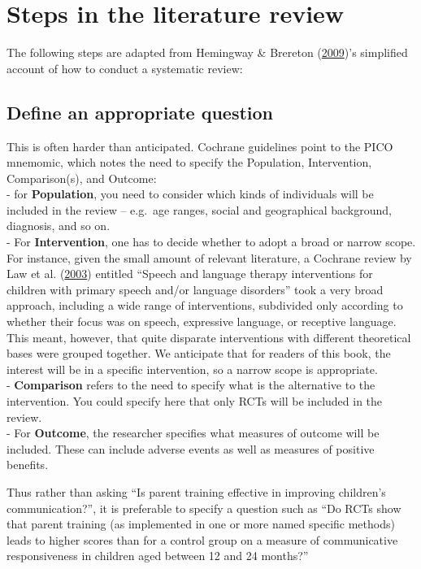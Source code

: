 \documentclass{krantz}
\begin{document}
\hypertarget{steps-in-the-literature-review}{%
\section{Steps in the literature review}\label{steps-in-the-literature-review}}

The following steps are adapted from Hemingway \& Brereton (\protect\hyperlink{ref-hemingway2009}{2009})'s simplified account of how to conduct a systematic review:\\

\hypertarget{define-an-appropriate-question}{%
\subsection{Define an appropriate question}\label{define-an-appropriate-question}}

This is often harder than anticipated. Cochrane guidelines point to the PICO mnemomic, which notes the need to specify the Population, Intervention, Comparison(s), and Outcome:\\
- for \textbf{Population}, you need to consider which kinds of individuals will be included in the review -- e.g.~age ranges, social and geographical background, diagnosis, and so on.\\
- For \textbf{Intervention}, one has to decide whether to adopt a broad or narrow scope. For instance, given the small amount of relevant literature, a Cochrane review by Law et al. (\protect\hyperlink{ref-law2003}{2003}) entitled ``Speech and language therapy interventions for children with primary speech and/or language disorders'' took a very broad approach, including a wide range of interventions, subdivided only according to whether their focus was on speech, expressive language, or receptive language. This meant, however, that quite disparate interventions with different theoretical bases were grouped together. We anticipate that for readers of this book, the interest will be in a specific intervention, so a narrow scope is appropriate.\\
- \textbf{Comparison} refers to the need to specify what is the alternative to the intervention. You could specify here that only RCTs will be included in the review.\\
- For \textbf{Outcome}, the researcher specifies what measures of outcome will be included. These can include adverse events as well as measures of positive benefits.

Thus rather than asking ``Is parent training effective in improving children's communication?'', it is preferable to specify a question such as ``Do RCTs show that parent training (as implemented in one or more named specific methods) leads to higher scores than for a control group on a measure of communicative responsiveness in children aged between 12 and 24 months?''
\end{document}
